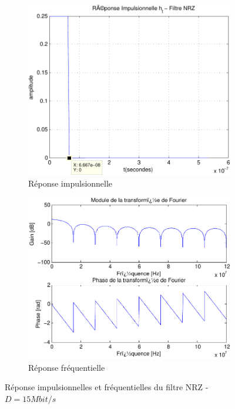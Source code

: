 \documentclass[a4paper,11pt]{article}
\begin{document}
\begin{figure}
	\begin{subfigure}{.5\textwidth}
  		\centering
  		\includegraphics[width=1\linewidth]{impul_nrz_15-crop.pdf}
  		\caption{Réponse impulsionnelle}
  		\label{fig:nrz_impul15M}
	\end{subfigure}
	\begin{subfigure}{.5\textwidth}
  		\centering
  		\includegraphics[width=1\linewidth]{frec_nrz_15-crop.pdf}
  		\caption{Réponse fréquentielle}
  		\label{fig:nrz_frec15M}
	\end{subfigure}%
	\caption{Réponse impulsionnelles et fréquentielles du filtre NRZ - $D=15 Mbit/s$}
	\label{fig:nrz1M}
\end{figure} 
\end{document}
